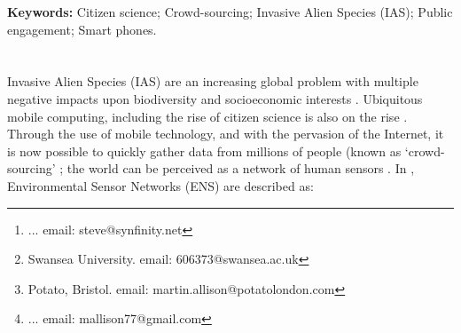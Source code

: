 \documentclass[10pt,psfig,letterpaper,twocolumn]{article}
\begin{document}
% 
%


\title{}
\author{
{}\thanks{... email: steve@synfinity.net }, \and
{}\thanks{Swansea University. email: 606373@swansea.ac.uk}, \and 
{}\thanks{Potato, Bristol. email: martin.allison@potatolondon.com}, \and
{}\thanks{... email: mallison77@gmail.com}\\
}
\date{}
\maketitle
\thispagestyle{empty}
\begin{abstract}
Invasive Alien Species (IAS) are a growing global problem, reducing biodiversity and causing significant negative socioeconomic impacts. Management and control is hampered by a lack of accessible data of adequate spatial and temporal resolution. Smart phone technology and cheap access to data networks may enable crowd-sourcing of IAS data to bridge the `data gap'. By engaging the general public in `citizen science', IAS-ESS (iAssess) aims to provide much-needed, real-time data to scientists.
\end{abstract}
{\bf Keywords:}
Citizen science; Crowd-sourcing; Invasive Alien Species (IAS);  Public engagement; Smart phones.
\section*{}

Invasive Alien Species (IAS) are an increasing global problem with multiple negative impacts upon biodiversity and socioeconomic interests \cite{Vila:2011ft, Vitousek:1997p78}. Ubiquitous mobile computing, including the rise of  citizen science is also on the rise \cite{Silvertown:2009tw}. Through the use of mobile technology, and with the pervasion of the Internet, it is now possible to quickly gather data from millions of people (known as `crowd-sourcing' \cite{Wired:2011uj}; the world can be perceived as a network of human sensors \cite{Goodchild:2007vt}. In \citet{Hart:2006uz}, Environmental Sensor Networks (ENS) are described as:
\end{document}
